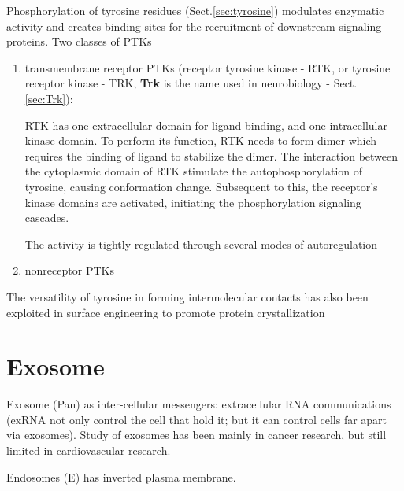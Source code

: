 Phosphorylation of tyrosine residues (Sect.\ref{sec:tyrosine}) modulates
enzymatic activity and creates binding sites for the recruitment of downstream
signaling proteins.
Two classes of PTKs \citep{hubbard2000}
\begin{enumerate}
  \item transmembrane receptor PTKs (receptor tyrosine kinase - RTK, or
  tyrosine receptor kinase - TRK, {\bf Trk} is the name used in neurobiology -
  Sect.\ref{sec:Trk}):
  
  RTK has one extracellular domain for ligand binding, and one intracellular
  kinase domain. To perform its function, RTK needs to form dimer which requires
  the binding of ligand to stabilize the dimer. 
  The interaction between the cytoplasmic domain 
  of RTK stimulate the autophosphorylation of tyrosine, causing conformation
  change. Subsequent to this, the receptor's kinase domains are activated,
  initiating the phosphorylation signaling cascades.
  
   The activity is tightly regulated through several modes of autoregulation
  
  
  \item nonreceptor PTKs
\end{enumerate}


The versatility of tyrosine in forming intermolecular
contacts has also been exploited in surface engineering
to promote protein crystallization



\section{Exosome}
\label{sec:exosome}

Exosome (Pan) as inter-cellular messengers:
extracellular RNA communications (exRNA not only control the cell that hold it;
but it can control cells far apart via exosomes). Study of exosomes has
been mainly in cancer research, but still limited in cardiovascular research.

Endosomes (E) has inverted plasma membrane.


